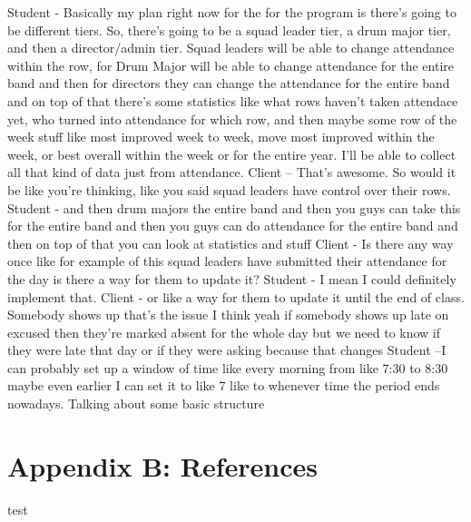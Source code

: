 \documentclass{article}
\begin{document}
		Student - Basically my plan right now for the for the program is there's going to be different tiers. So, there’s going to be a squad leader tier, a drum major tier, and then a director/admin tier. Squad leaders will be able to change attendance within the row, for Drum Major will be able to change attendance for the entire band and then for directors they can change the attendance for the entire band and on top of that there's some statistics like what rows haven't taken attendace yet, who turned into attendance for which row, and then maybe some row of the week stuff like most improved week to week, move most improved within the week, or best overall within the week or for the entire year. I’ll be able to collect all that kind of data just from attendance.
		Client – That’s awesome. So would it be like you're thinking, like you said squad leaders have control over their rows. 
		Student - and then drum majors the entire band and then you guys can take this for the entire band and then you guys can do attendance for the entire band and then on top of that you can look at statistics and stuff
		Client - Is there any way once like for example of this squad leaders have submitted their attendance for the day is there a way for them to update it?
		Student - I mean I could definitely implement that.
		Client - or like a way for them to update it until the end of class. Somebody shows up that's the issue I think yeah if somebody shows up late on excused then they're marked absent for the whole day but we need to know if they were late that day or if they were asking because that changes 
		Student –I can probably set up a window of time like every morning from like 7:30 to 8:30 maybe even earlier I can set it to like 7 like to whenever time the period ends nowadays. Talking about some basic structure %
		\newpage
	\section{Appendix B: References}
	test\cite{java17}
	{}
	
\end{document}
